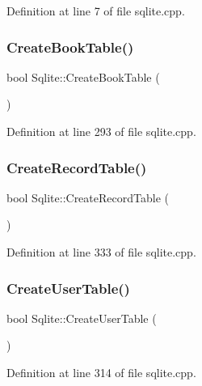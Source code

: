 Definition at line 7 of file sqlite.\+cpp.

\mbox{\label{class_sqlite_a2c8180569a048b3e69abd84a044caec6}} 
\subsubsection{\texorpdfstring{CreateBookTable()}{CreateBookTable()}}
{\footnotesize\ttfamily bool Sqlite\+::\+Create\+Book\+Table (\begin{DoxyParamCaption}{ }\end{DoxyParamCaption})}



Definition at line 293 of file sqlite.\+cpp.

\mbox{\label{class_sqlite_ae84aab901a62d1876dcfca3f190af12c}} 
\subsubsection{\texorpdfstring{CreateRecordTable()}{CreateRecordTable()}}
{\footnotesize\ttfamily bool Sqlite\+::\+Create\+Record\+Table (\begin{DoxyParamCaption}{ }\end{DoxyParamCaption})}



Definition at line 333 of file sqlite.\+cpp.

\mbox{\label{class_sqlite_aa0840501ef42abf7fff8efc064caae01}} 
\subsubsection{\texorpdfstring{CreateUserTable()}{CreateUserTable()}}
{\footnotesize\ttfamily bool Sqlite\+::\+Create\+User\+Table (\begin{DoxyParamCaption}{ }\end{DoxyParamCaption})}



Definition at line 314 of file sqlite.\+cpp.

\mbox{\label{class_sqlite_a772711beeceff7a567192e19abccfed4}} 
